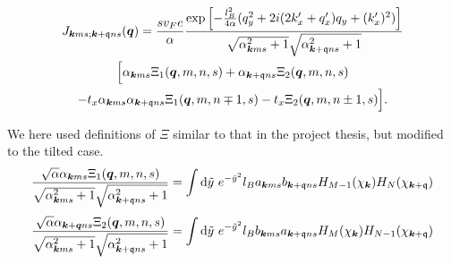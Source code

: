 \begin{multline}
  J_{\bm{k} m s; \bm{k} + \mathfrak{q} n s} (\bm{q}) =
  \frac{s v_{F} e}{\alpha }
  \frac{
    \exp \left[
      -\frac{l_{B}^2}{4 \alpha } (q_{y}^2 + 2i (2 k'_x + q'_x) q_{y} + (k'_x)^2 )
    \right]
  }{
    \sqrt{\alpha _{\bm{k} m s}^2 + 1} \sqrt{ \alpha _{\bm{k} + \mathfrak{q} n s}^2 + 1 }
  } \\
  \Big[
   \alpha _{\bm{k} m s} \Xi_{1} (\bm{q}, m, n, s)
    + \alpha _{\bm{k} + \mathfrak{q} n s} \Xi _{2} (\bm{q}, m, n, s)\\
    - t_x \alpha _{\bm{k} m s} \alpha _{\bm{k} + \mathfrak{q} n s} \Xi _1(\bm{q}, m, n\mp 1, s)
    - t_x \Xi _2(\bm{q}, m, n\pm 1, s)
  \Big].
\end{multline}

We here used definitions of \( \Xi \) similar to that in the project thesis, but modified to the tilted case.
\begin{equation}
  \label{eq:30}
  \frac{ \sqrt{\alpha } \alpha _{\bm{k} m s} \Xi_1 ( \bm{q}, m, n, s )}{
    \sqrt{\alpha _{\bm{k} m s}^2 + 1}
    \sqrt{\alpha _{\bm{k} + \mathfrak{q} n s} ^2 + 1}
  }
  =
  \int \mathrm{d} \tilde{y}
  ~e^{-\tilde{y}^2}
  l_{B}
  a_{\bm{k} m s} b_{\bm{k} + \mathfrak{q} ns}
  H_{M-1} (\chi_{\bm{k}})
  H_N ( \chi _{\bm{k} + \mathfrak{q}} )
\end{equation}
\begin{equation}
  \label{eq:31}
  \frac{ \sqrt{\alpha } \alpha _{\bm{k} + \bm{q} n s} \Xi_2 ( \bm{q}, m, n, s )}{
    \sqrt{\alpha _{\bm{k} m s}^2 + 1}
    \sqrt{\alpha _{\bm{k} + \mathfrak{q} n s} ^2 + 1}
  }
  =
  \int \mathrm{d} \tilde{y}
  ~e^{-\tilde{y}^2}
  l_{B}
  b_{\bm{k} m s} a_{\bm{k} + \mathfrak{q} ns}
  H_{M} (\chi_{\bm{k}})
  H_{N-1} ( \chi _{\bm{k} + \mathfrak{q}} )
\end{equation}

